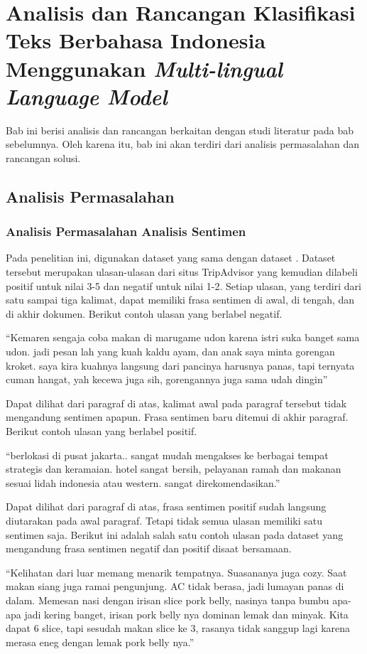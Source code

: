 \chapter{Analisis dan Rancangan Klasifikasi Teks Berbahasa Indonesia Menggunakan \textit{Multi-lingual Language Model}}

Bab ini berisi analisis dan rancangan berkaitan dengan studi literatur pada bab sebelumnya. Oleh karena itu, bab ini akan terdiri dari analisis permasalahan dan rancangan solusi.

\section{Analisis Permasalahan}
	\subsection{Analisis Permasalahan Analisis Sentimen}
	Pada penelitian ini, digunakan dataset yang sama dengan dataset \parencite{FarhanKhodra2017}. Dataset tersebut merupakan ulasan-ulasan dari situs TripAdvisor yang kemudian dilabeli positif untuk nilai 3-5 dan negatif untuk nilai 1-2. Setiap ulasan, yang terdiri dari satu sampai tiga kalimat, dapat memiliki frasa sentimen di awal, di tengah, dan di akhir dokumen. Berikut contoh ulasan yang berlabel negatif.

	“Kemaren sengaja coba makan di marugame udon karena istri suka banget sama udon. jadi pesan lah yang kuah kaldu ayam, dan anak saya minta gorengan kroket. saya kira kuahnya langsung dari pancinya harusnya panas, tapi ternyata cuman hangat, yah kecewa juga sih, gorengannya juga sama udah dingin” 

	Dapat dilihat dari paragraf di atas, kalimat awal pada paragraf tersebut tidak mengandung sentimen apapun. Frasa sentimen baru ditemui di akhir paragraf. Berikut contoh ulasan yang berlabel positif.

	“berlokasi di pusat jakarta.. sangat mudah mengakses ke berbagai tempat strategis dan keramaian. hotel sangat bersih, pelayanan ramah dan makanan sesuai lidah indonesia atau western. sangat direkomendasikan.”

	Dapat dilihat dari paragraf di atas, frasa sentimen positif sudah langsung diutarakan pada awal paragraf. Tetapi tidak semua ulasan memiliki satu sentimen saja. Berikut ini adalah salah satu contoh ulasan pada dataset yang mengandung frasa sentimen negatif dan positif disaat bersamaan. 

	“Kelihatan dari luar memang menarik tempatnya. Suasananya juga cozy. Saat makan siang juga ramai pengunjung. AC tidak berasa, jadi lumayan panas di dalam. Memesan nasi dengan irisan slice pork belly, nasinya tanpa bumbu apa- apa jadi kering banget, irisan pork belly nya dominan lemak dan minyak. Kita dapat 6 slice, tapi sesudah makan slice ke 3, rasanya tidak sanggup lagi karena merasa eneg dengan lemak pork belly nya.”

